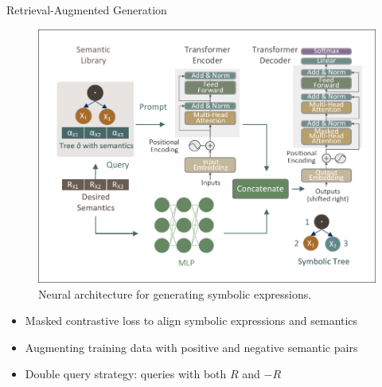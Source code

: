 \documentclass[final]{beamer}
\newlength{\onecolwid}
\begin{document}
\begin{frame}[t]
\begin{columns}[t]
\begin{column}{\onecolwid}
                \begin{block}{Retrieval-Augmented Generation}
                    \begin{figure}
                        \centering
                        \includegraphics[width=\linewidth, trim=25 20 15 10, clip]{figs/Transformer.pdf}
                        \caption{Neural architecture for generating symbolic expressions.}
                    \end{figure}


                    \begin{itemize}
                        \item Masked contrastive loss to align symbolic expressions and semantics
                        \item Augmenting training data with positive and negative semantic pairs
                        \item Double query strategy: queries with both $R$ and $-R$
                    \end{itemize}


\end{block}
\end{column}
\end{columns}
\end{frame}
\end{document}
